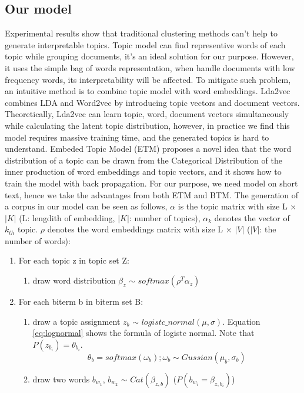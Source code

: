 \subsection{Our model}
\label{sec:modeling}
Experimental results show that traditional clustering methods can't help to generate interpretable topics.
Topic model can find representive words of each topic while grouping documents, it's an ideal solution for our purpose. However, it uses the simple bag of words representation, when handle documents with low frequency words, its interpretability will be affected. To mitigate such problem, an intuitive method is to combine topic model with word embeddings. Lda2vec \cite{moody2016mixing} combines LDA and Word2vec by introducing topic vectors and document vectors. Theoretically, Lda2vec can learn topic, word, document vectors simultaneously while calculating the latent topic distribution, however, in practice we find this model requires massive training time, and the generated topics is hard to understand. Embeded Topic Model (ETM) \cite{dieng2019topic} proposes a novel idea that the word distribution of a topic can be drawn from the Categorical Distribution of the inner production of word embeddings and topic vectors, and it shows how to train the model with back propagation. For our purpose, we need model on short text, hence we take the advantages from both ETM and BTM. The generation of a corpus in our model can be seen as follows, $\alpha$ is the topic matrix with size L $\times$ $|K|$ (L: lengdith of embedding, $|K|$: number of topics), $\alpha_k$ denotes the vector of $k_{th}$ topic. $\rho$ denotes the word embeddings matrix with size L $\times$ $|V|$ ($|V|$: the number of words):
\begin{enumerate}
    \item For each topic z in topic set Z:
    \begin{enumerate}
        \item draw word distribution $\beta_z$ $\sim$ $softmax(\rho^T\alpha_z)$
    \end{enumerate}
    \item For each biterm b in biterm set B:
    \begin{enumerate}
        \item draw a topic assignment $z_b$ $\sim$ $logistc\_normal(\mu, \sigma)$.
        Equation \ref{eq:lognormal} shows the formula of logistc normal. Note that $P(z_{b_i}) = \theta_{b_i}$.
        \begin{equation}
            \theta_b=softmax(\omega_b); \omega_b \sim Gussian(\mu_b, \sigma_b)
            \label{eq:lognormal}
        \end{equation}
        \item draw two words $b_{w_1}$, $b_{w_2}$ $\sim$ $Cat(\beta_{z,b})$ ($P(b_{w_i} = \beta_{z,{b_i}})$)
    \end{enumerate}
\end{enumerate} 
